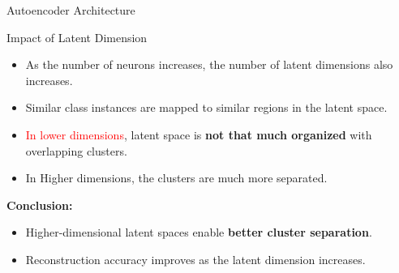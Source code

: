 \documentclass{beamer}
\begin{document}
\begin{frame}[t]{Autoencoder Architecture}
\begin{center}
    \end{center}
\end{frame}

\begin{frame}{Impact of Latent Dimension}
    \begin{itemize}
        \item \textcolor{orange!80!black}{As the number of neurons increases}, the number of latent dimensions also increases.
        \item \textcolor{blue!80!black}{Similar class instances} are mapped to similar regions in the latent space.
        \item \textcolor{red}{In lower dimensions}, latent space is \textbf{not that much organized} with overlapping clusters.
        \item \textcolor{green!60!black}{In Higher dimensions}, the clusters are much more separated.
    \end{itemize}
    \vspace{0.3cm}
    \begin{tcolorbox}[colback=blue!5!white, colframe=blue!75!black, sharp corners=all, boxrule=0.8mm]
        \textbf{Conclusion:}
        \begin{itemize}
            \item Higher-dimensional latent spaces enable \textbf{better cluster separation}.
            \item Reconstruction accuracy improves as the latent dimension increases.
        \end{itemize}
    \end{tcolorbox}
\end{frame}
\end{document}
